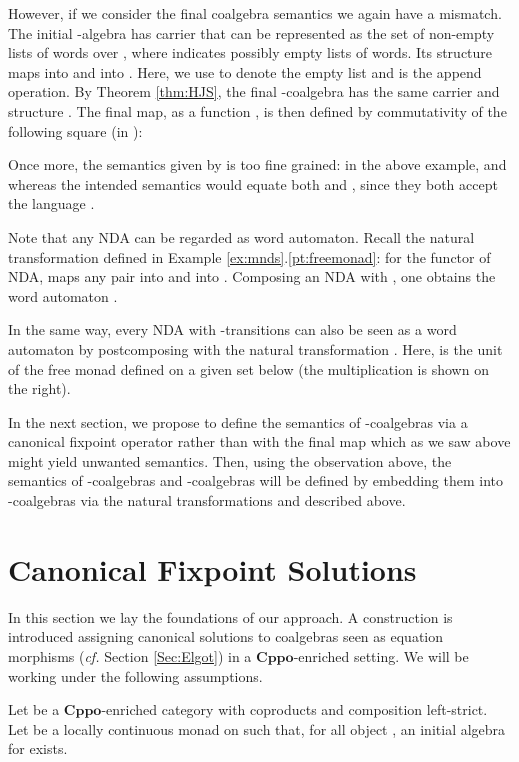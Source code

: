 \documentclass[oribibl,envcountsame,envcountsect,runningheads]{llncs}
\newcommand{\cat}[1]{\ensuremath{\mathbf{#1}}}
\newcommand{\cppo}{\cat{Cppo}}
\renewcommand{\>}{\rangle}
\begin{document}
However, if we consider the final coalgebra semantics we again have a mismatch.
The initial -algebra has carrier   that can be represented as the set of non-empty lists of words over , where  indicates possibly empty lists of words. Its structure  maps  into  and  into . Here, we use  to denote the empty list and  is the append operation. By Theorem \ref{thm:HJS},
the final -coalgebra has the same carrier and structure . The final map, as a function , is then defined by commutativity of the following square (in ):


Once more, the semantics given by  is too fine grained: in the above example,  and  whereas the intended semantics would equate both  and , since they both accept the language .

\medskip

Note that any NDA can be regarded as word automaton. Recall the natural transformation  defined in Example \ref{ex:mnds}.\ref{pt:freemonad}: for the functor  of NDA,  maps any pair  into  and  into . Composing an NDA  with , one obtains the word automaton .

In the same way, every NDA with -transitions can also be seen as a word automaton by postcomposing with the natural transformation . Here,  is the unit of the free monad
 defined on a given set  below (the multiplication  is shown on the right).

In the next section, we propose to define the semantics of -coalgebras via a canonical fixpoint operator rather than with the final map which as we saw above might yield unwanted semantics. Then, using the observation above, the semantics of -coalgebras and -coalgebras will be defined by embedding them into -coalgebras via the natural transformations  and  described above.
\section{Canonical Fixpoint Solutions}\label{sec:Theory}
In this section we lay the foundations of our approach. A construction is introduced assigning canonical solutions to coalgebras seen as equation morphisms (\emph{cf.} Section \ref{Sec:Elgot}) in a \cppo-enriched setting. We will be working under the following assumptions.
\begin{assumption}\label{ass:CPPOenrichTcont}
  Let  be a \cppo-enriched category with coproducts and  composition left-strict.
  Let  be a locally continuous monad on  such
  that, for all object , an initial algebra for  exists.
\end{assumption}
\end{document}
